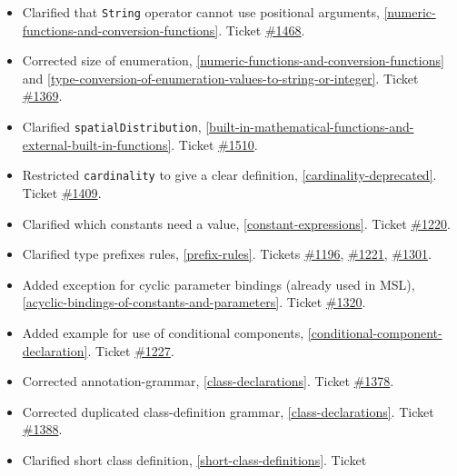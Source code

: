 \begin{itemize}
\item
  Clarified that \lstinline!String! operator cannot use positional arguments, \cref{numeric-functions-and-conversion-functions}.
  Ticket \href{https://github.com/modelica/ModelicaSpecification/issues/1468}{\#1468}.
\item
  Corrected size of enumeration, \cref{numeric-functions-and-conversion-functions} and \cref{type-conversion-of-enumeration-values-to-string-or-integer}. Ticket
  \href{https://github.com/modelica/ModelicaSpecification/issues/1369}{\#1369}.
\item
  Clarified \lstinline!spatialDistribution!, \cref{built-in-mathematical-functions-and-external-built-in-functions}.
  Ticket \href{https://github.com/modelica/ModelicaSpecification/issues/1510}{\#1510}.
\item
  Restricted \lstinline!cardinality! to give a clear definition, \cref{cardinality-deprecated}.
  Ticket \href{https://github.com/modelica/ModelicaSpecification/issues/1409}{\#1409}.
\item
  Clarified which constants need a value, \cref{constant-expressions}. Ticket
  \href{https://github.com/modelica/ModelicaSpecification/issues/1220}{\#1220}.
\item
  Clarified type prefixes rules, \cref{prefix-rules}. Tickets
  \href{https://github.com/modelica/ModelicaSpecification/issues/1196}{\#1196},
  \href{https://github.com/modelica/ModelicaSpecification/issues/1221}{\#1221},
  \href{https://github.com/modelica/ModelicaSpecification/issues/1301}{\#1301}.
\item
  Added exception for cyclic parameter bindings (already used in MSL),
  \cref{acyclic-bindings-of-constants-and-parameters}. Ticket
  \href{https://github.com/modelica/ModelicaSpecification/issues/1320}{\#1320}.
\item
  Added example for use of conditional components, \cref{conditional-component-declaration}. Ticket
  \href{https://github.com/modelica/ModelicaSpecification/issues/1227}{\#1227}.
\item
  Corrected annotation-grammar, \cref{class-declarations}. Ticket
  \href{https://github.com/modelica/ModelicaSpecification/issues/1378}{\#1378}.
\item
  Corrected duplicated class-definition grammar, \cref{class-declarations}. Ticket
  \href{https://github.com/modelica/ModelicaSpecification/issues/1388}{\#1388}.
\item
  Clarified short class definition, \cref{short-class-definitions}. Ticket

\end{itemize}
